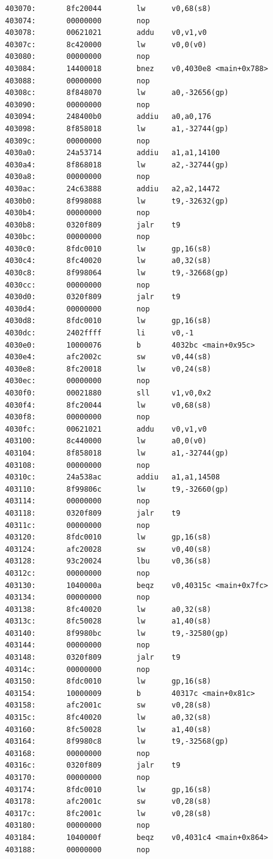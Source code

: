 \documentclass[11pt]{article}
\begin{document}
\begin{verbatim}
  403070:       8fc20044        lw      v0,68(s8)
  403074:       00000000        nop
  403078:       00621021        addu    v0,v1,v0
  40307c:       8c420000        lw      v0,0(v0)
  403080:       00000000        nop
  403084:       14400018        bnez    v0,4030e8 <main+0x788>
  403088:       00000000        nop
  40308c:       8f848070        lw      a0,-32656(gp)
  403090:       00000000        nop
  403094:       248400b0        addiu   a0,a0,176
  403098:       8f858018        lw      a1,-32744(gp)
  40309c:       00000000        nop
  4030a0:       24a53714        addiu   a1,a1,14100
  4030a4:       8f868018        lw      a2,-32744(gp)
  4030a8:       00000000        nop
  4030ac:       24c63888        addiu   a2,a2,14472
  4030b0:       8f998088        lw      t9,-32632(gp)
  4030b4:       00000000        nop
  4030b8:       0320f809        jalr    t9
  4030bc:       00000000        nop
  4030c0:       8fdc0010        lw      gp,16(s8)
  4030c4:       8fc40020        lw      a0,32(s8)
  4030c8:       8f998064        lw      t9,-32668(gp)
  4030cc:       00000000        nop
  4030d0:       0320f809        jalr    t9
  4030d4:       00000000        nop
  4030d8:       8fdc0010        lw      gp,16(s8)
  4030dc:       2402ffff        li      v0,-1
  4030e0:       10000076        b       4032bc <main+0x95c>
  4030e4:       afc2002c        sw      v0,44(s8)
  4030e8:       8fc20018        lw      v0,24(s8)
  4030ec:       00000000        nop
  4030f0:       00021880        sll     v1,v0,0x2
  4030f4:       8fc20044        lw      v0,68(s8)
  4030f8:       00000000        nop
  4030fc:       00621021        addu    v0,v1,v0
  403100:       8c440000        lw      a0,0(v0)
  403104:       8f858018        lw      a1,-32744(gp)
  403108:       00000000        nop
  40310c:       24a538ac        addiu   a1,a1,14508
  403110:       8f99806c        lw      t9,-32660(gp)
  403114:       00000000        nop
  403118:       0320f809        jalr    t9
  40311c:       00000000        nop
  403120:       8fdc0010        lw      gp,16(s8)
  403124:       afc20028        sw      v0,40(s8)
  403128:       93c20024        lbu     v0,36(s8)
  40312c:       00000000        nop
  403130:       1040000a        beqz    v0,40315c <main+0x7fc>
  403134:       00000000        nop
  403138:       8fc40020        lw      a0,32(s8)
  40313c:       8fc50028        lw      a1,40(s8)
  403140:       8f9980bc        lw      t9,-32580(gp)
  403144:       00000000        nop
  403148:       0320f809        jalr    t9
  40314c:       00000000        nop
  403150:       8fdc0010        lw      gp,16(s8)
  403154:       10000009        b       40317c <main+0x81c>
  403158:       afc2001c        sw      v0,28(s8)
  40315c:       8fc40020        lw      a0,32(s8)
  403160:       8fc50028        lw      a1,40(s8)
  403164:       8f9980c8        lw      t9,-32568(gp)
  403168:       00000000        nop
  40316c:       0320f809        jalr    t9
  403170:       00000000        nop
  403174:       8fdc0010        lw      gp,16(s8)
  403178:       afc2001c        sw      v0,28(s8)
  40317c:       8fc2001c        lw      v0,28(s8)
  403180:       00000000        nop
  403184:       1040000f        beqz    v0,4031c4 <main+0x864>
  403188:       00000000        nop
    \end{verbatim}
\end{document}
